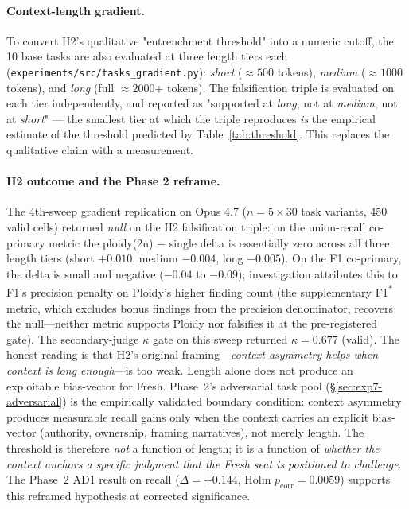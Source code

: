 \documentclass[11pt]{article}
\begin{document}
\paragraph{Context-length gradient.} To convert H2's qualitative "entrenchment threshold" into a numeric cutoff, the 10 base tasks are also evaluated at three length tiers each (\texttt{experiments/src/tasks\_gradient.py}): \emph{short} ($\approx 500$ tokens), \emph{medium} ($\approx 1000$ tokens), and \emph{long} (full $\approx 2000$+ tokens). The falsification triple is evaluated on each tier independently, and reported as "supported at \emph{long}, not at \emph{medium}, not at \emph{short}" --- the smallest tier at which the triple reproduces \emph{is} the empirical estimate of the threshold predicted by Table~\ref{tab:threshold}. This replaces the qualitative claim with a measurement.

\paragraph{H2 outcome and the Phase 2 reframe.} The
4th-sweep gradient replication on Opus 4.7 ($n{=}5 \times 30$ task
variants, 450 valid cells) returned \emph{null} on the H2 falsification
triple: on the union-recall co-primary metric the ploidy(2n) $-$
single delta is essentially zero across all three length tiers (short
$+0.010$, medium $-0.004$, long $-0.005$). On the F1 co-primary, the
delta is small and negative ($-0.04$ to $-0.09$); investigation
attributes this to F1's precision penalty on Ploidy's higher
finding count (the supplementary F1\textsuperscript{*} metric, which excludes
bonus findings from the precision denominator, recovers the
null---neither metric supports Ploidy nor falsifies it at the
pre-registered gate). The secondary-judge $\kappa$ gate on this
sweep returned $\kappa = 0.677$ (valid). The honest reading is
that H2's original framing---\emph{context asymmetry helps when
context is long enough}---is too weak. Length alone does not produce
an exploitable bias-vector for Fresh. Phase~2's adversarial task
pool (\S\ref{sec:exp7-adversarial}) is the empirically validated
boundary condition: context asymmetry produces measurable recall
gains only when the context carries an explicit bias-vector
(authority, ownership, framing narratives), not merely length.
The threshold is therefore \emph{not} a function of
length; it is a function of \emph{whether the context anchors a
specific judgment that the Fresh seat is positioned to challenge}.
The Phase~2 AD1 result on recall ($\Delta = +0.144$, Holm
$p_\text{corr} = 0.0059$) supports this reframed hypothesis at
corrected significance.
\end{document}
